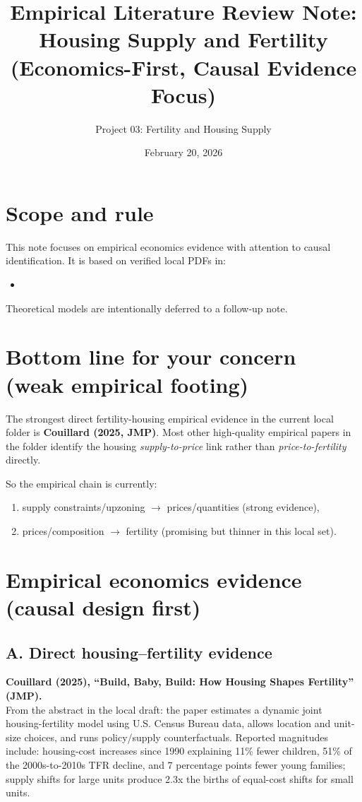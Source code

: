 \documentclass[11pt]{article}
\title{Empirical Literature Review Note: Housing Supply and Fertility\\(Economics-First, Causal Evidence Focus)}
\author{Project 03: Fertility and Housing Supply}
\date{February 20, 2026}
\begin{document}
\maketitle

\section*{Scope and rule}
This note focuses on empirical economics evidence with attention to causal identification. It is based on verified local PDFs in:
\begin{itemize}
    \item {}
\end{itemize}
Theoretical models are intentionally deferred to a follow-up note.

\section{Bottom line for your concern (weak empirical footing)}
The strongest direct fertility-housing empirical evidence in the current local folder is \textbf{Couillard (2025, JMP)}. Most other high-quality empirical papers in the folder identify the housing \emph{supply-to-price} link rather than \emph{price-to-fertility} directly. 

So the empirical chain is currently:
\begin{enumerate}
    \item supply constraints/upzoning $\rightarrow$ prices/quantities (strong evidence),
    \item prices/composition $\rightarrow$ fertility (promising but thinner in this local set).
\end{enumerate}

\section{Empirical economics evidence (causal design first)}
\subsection*{A. Direct housing--fertility evidence}
\textbf{Couillard (2025), ``Build, Baby, Build: How Housing Shapes Fertility'' (JMP).} \\
From the abstract in the local draft: the paper estimates a dynamic joint housing-fertility model using U.S. Census Bureau data, allows location and unit-size choices, and runs policy/supply counterfactuals. Reported magnitudes include: housing-cost increases since 1990 explaining 11\% fewer children, 51\% of the 2000s-to-2010s TFR decline, and 7 percentage points fewer young families; supply shifts for large units produce 2.3x the births of equal-cost shifts for small units.
\end{document}
